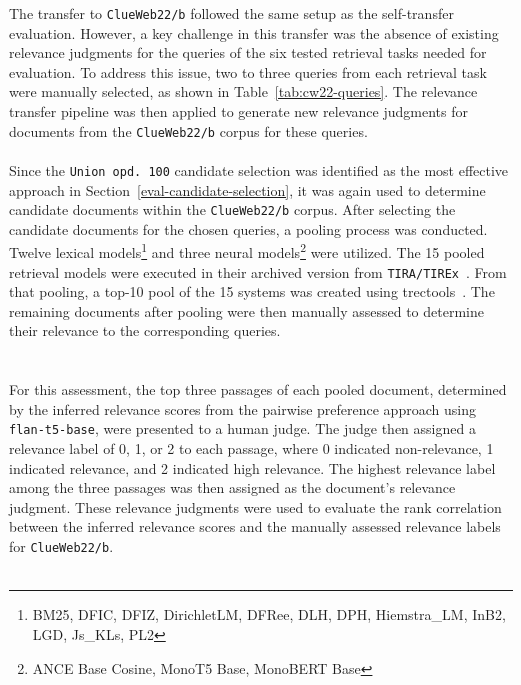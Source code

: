 The transfer to \texttt{ClueWeb22/b} followed the same setup as the self-transfer evaluation. However, a key challenge in this transfer was the absence of existing relevance judgments for the queries of the six tested retrieval tasks needed for evaluation. To address this issue, two to three queries from each retrieval task were manually selected, as shown in Table~\ref{tab:cw22-queries}. The relevance transfer pipeline was then applied to generate new relevance judgments for documents from the \texttt{ClueWeb22/b} corpus for these queries.
\\\\
Since the \texttt{Union opd.\ 100} candidate selection was identified as the most effective approach in Section~\ref{eval-candidate-selection}, it was again used to determine candidate documents within the \texttt{ClueWeb22/b} corpus. After selecting the candidate documents for the chosen queries, a pooling process was conducted. Twelve lexical models\footnote{\scriptsize BM25, DFIC, DFIZ, DirichletLM, DFRee, DLH, DPH, Hiemstra\_LM, InB2, LGD, Js\_KLs, PL2} and three neural models\footnote{\scriptsize ANCE Base Cosine, MonoT5 Base, MonoBERT Base} were utilized. The 15 pooled retrieval models were executed in their archived version from \texttt{TIRA/TIREx}~\citep{froebe:2023b,froebe:2023c}. From that pooling, a top-10 pool of the 15 systems was created using trectools~\citep{palotti:2019}. The remaining documents after pooling were then manually assessed to determine their relevance to the corresponding queries.
\\\\\\
For this assessment, the top three passages of each pooled document, determined by the inferred relevance scores from the pairwise preference approach using \texttt{flan-t5-base}, were presented to a human judge. The judge then assigned a relevance label of 0, 1, or 2 to each passage, where 0 indicated non-relevance, 1 indicated relevance, and 2 indicated high relevance. The highest relevance label among the three passages was then assigned as the document's relevance judgment. These relevance judgments were used to evaluate the rank correlation between the inferred relevance scores and the manually assessed \mbox{relevance} labels for \texttt{ClueWeb22/b}.
\\\\
